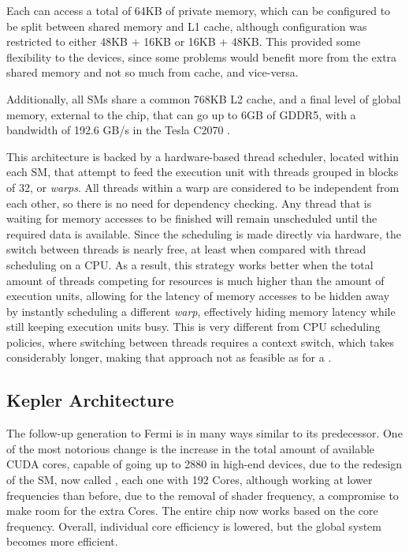 \documentclass[main.tex]{subfiles}
\begin{document}
Each \sm can access a total of 64KB of private memory, which can be configured to be split between shared memory and L1 cache, although configuration was restricted to either 48KB + 16KB or 16KB + 48KB. This provided some flexibility to the devices, since some problems would benefit more from the extra shared memory and not so much from cache, and vice-versa.

Additionally, all \acsp{SM} share a common 768KB L2 cache, and a final level of global memory, external to the chip, that can go up to 6GB of GDDR5, with a bandwidth of 192.6 GB/s in the Tesla C2070 \cite{NVIDIA:fermi}.


This architecture is backed by a hardware-based thread scheduler, located within each \acs{SM}, that attempt to feed the execution unit with threads grouped in blocks of 32, or \textit{warps}. All threads within a warp are considered to be independent from each other, so there is no need for dependency checking. Any thread that is waiting for memory accesses to be finished will remain unscheduled until the required data is available. Since the scheduling is made directly via hardware, the switch between threads is nearly free, at least when compared with thread scheduling on a \acs{CPU}. As a result, this strategy works better when the total amount of threads competing for resources is much higher than the amount of execution units, allowing for the latency of memory accesses to be hidden away by instantly scheduling a different \textit{warp}, effectively hiding memory latency while still keeping execution units busy. This is very different from \acs{CPU} scheduling policies, where switching between threads requires a context switch, which takes considerably longer, making that approach not as feasible as for a \gpus.



\subsection{Kepler Architecture}

The follow-up generation to Fermi is in many ways similar to its predecessor. One of the most notorious change is the increase in the total amount of available CUDA cores, capable of going up to 2880 in high-end devices, due to the redesign of the \acl{SM}, now called \smx, each one with 192 \cuda Cores, although working at lower frequencies than before, due to the removal of shader frequency, a compromise to make room for the extra \cuda Cores. The entire chip now works based on the core frequency. Overall, individual core efficiency is lowered, but the global system becomes more efficient.
\end{document}
